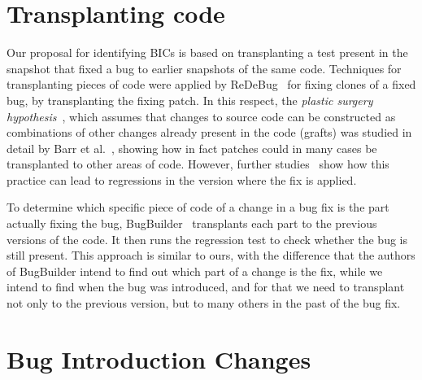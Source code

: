\section{Transplanting code}
\label{sec:transplating-code:related}

Our proposal for identifying BICs is based on transplanting a test present in the snapshot that fixed a bug to earlier snapshots of the same code. Techniques for transplanting pieces of code were applied by ReDeBug~\cite{jang2012redebug} for fixing clones of a fixed bug, by transplanting the fixing patch. In this respect, the \emph{plastic surgery hypothesis}~\cite{harman2010:automated_patching}, which assumes that changes to source code can be constructed as combinations of other changes already present in the code (grafts) was studied in detail by Barr et al.~\cite{barr2014plastic}, showing how in fact patches could in many cases be transplanted to other areas of code. However, further studies~\cite{castelluccio2019empirical} show how this practice can lead to regressions in the version where the fix is applied.

To determine which specific piece of code of a change in a bug fix is the part actually fixing the bug, BugBuilder~\cite{jiang2021extracting} transplants each part to the previous versions of the code. It then runs the regression test to check whether the bug is still present. This approach is similar to ours, with the difference that the authors of BugBuilder intend to find out which part of a change is the fix, while we intend to find when the bug was introduced, and for that we need to transplant not only to the previous version, but to many others in the past of the bug fix.

\section{Bug Introduction Changes}
\label{sec:bic:related}

